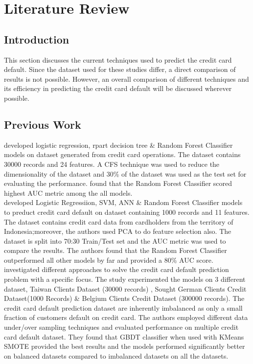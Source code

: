 \documentclass[twoside,11pt,a4paper]{article}
\begin{document}
\section{Literature Review}\label{sec:literature_review}
\subsection{Introduction}
This section discusses the current techniques used to predict the credit card default. Since the dataset used for these studies differ, a direct comparison of results is not possible. However, an overall comparison of different techniques and its efficiency in predicting the credit card default will be discussed wherever possible.

\subsection{Previous Work}
\citep{sayjadah2018credit} developed logistic regression, rpart decision tree \& Random Forest Classifier models on dataset generated from credit card operations. The dataset contains 30000 records and 24 features. A \acf{CFS} technique was used to reduce the dimensionality of the dataset and 30\% of the dataset was used as the test set for evaluating the performance. \citep{sayjadah2018credit} found that the Random Forest Classifier scored highest \acf{AUC} metric among the all models.\\

\citep{widyadhanacredit} developed Logistic Regressiion, \acs{SVM}, \acs{ANN} \& Random Forest Classifier models to preduct credit card default on dataset containing 1000 records and 11 features. The dataset contains credit card data from cardholders from the territory of Indonesia;moreover, the authors used \acf{PCA} to do feature selection also. The dataset is split into 70:30 Train/Test set and the \acs{AUC} metric was used to compare the results. The authors found that the Random Forest Classifier outperformed all other models by far and provided a 80\% \acs{AUC} score.\\


\citep{alam2020investigation} investigated different approaches to solve the credit card default prediction problem with a specific focus. The study experimented the models on 3 different dataset, Taiwan Clients Dataset (30000 records) \citep{yeh2009comparisons}, Sought German Clients Credit Dataset(1000 Records) \& Belgium Clients Credit Dataset (300000 records).  The credit card default prediction dataset are inherently imbalanced as only a small fraction of customers default on credit card. The authors employed different data under/over sampling techniques and evaluated performance on multiple credit card default dataset. They found that \acs{GBDT} classifier when used with KMeans \acs{SMOTE} provided the best results and the models performed significantly better on balanced datasets compared to imbalanced datasets on all the datasets.\\
\end{document}

